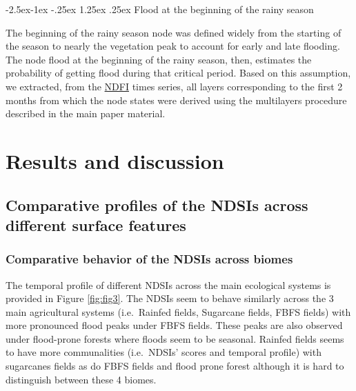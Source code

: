 \documentclass[12pt,oneside]{article}
\makeatletter
\renewcommand\paragraph{\@startsection{paragraph}{4}{\z@}%
            {-2.5ex\@plus -1ex \@minus -.25ex}%
            {1.25ex \@plus .25ex}%
            {\normalfont\normalsize\bfseries}}
\makeatother
\begin{document}
\hypertarget{I529}{%
\paragraph{Flood at the beginning of the rainy season}\label{I529}}

The beginning of the rainy season node was defined widely from the starting of the season to nearly the vegetation peak to account for early and late flooding. The node flood at the beginning of the rainy season, then, estimates the probability of getting flood during that critical period. Based on this assumption, we extracted, from the \href{http://journals.plos.org/plosone/article/file?id=10.1371/journal.pone.0088741\&type=printable}{NDFI} times series, all layers corresponding to the first 2 months from which the node states were derived using the multilayers procedure described in the main paper material.

\hypertarget{II}{%
\section{Results and discussion}\label{II}}

\hypertarget{II1}{%
\subsection{Comparative profiles of the NDSIs across different surface features}\label{II1}}

\hypertarget{II11}{%
\subsubsection{Comparative behavior of the NDSIs across biomes}\label{II11}}

The temporal profile of different NDSIs across the main ecological systems is provided in Figure \ref{fig:fig3}. The NDSIs seem to behave similarly across the 3 main agricultural systems (i.e.~Rainfed fields, Sugarcane fields, FBFS fields) with more pronounced flood peaks under FBFS fields. These peaks are also observed under flood-prone forests where floods seem to be seasonal. Rainfed fields seems to have more communalities (i.e.~NDSIs' scores and temporal profile) with sugarcanes fields as do FBFS fields and flood prone forest although it is hard to distinguish between these 4 biomes.
\end{document}
